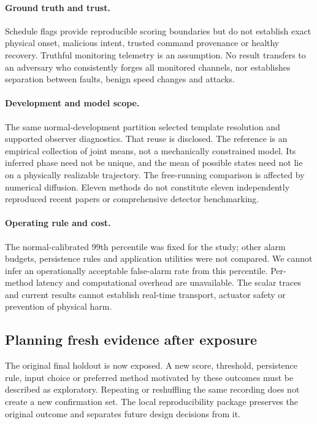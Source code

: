 \paragraph{Ground truth and trust.} Schedule flags provide reproducible scoring boundaries but do not establish exact physical onset, malicious intent, trusted command provenance or healthy recovery. Truthful monitoring telemetry is an assumption. No result transfers to an adversary who consistently forges all monitored channels, nor establishes separation between faults, benign speed changes and attacks.

\paragraph{Development and model scope.} The same normal-development partition selected template resolution and supported observer diagnostics. That reuse is disclosed. The reference is an empirical collection of joint means, not a mechanically constrained model. Its inferred phase need not be unique, and the mean of possible states need not lie on a physically realizable trajectory. The free-running comparison is affected by numerical diffusion. Eleven methods do not constitute eleven independently reproduced recent papers or comprehensive detector benchmarking.

\paragraph{Operating rule and cost.} The normal-calibrated 99th percentile was fixed for the study; other alarm budgets, persistence rules and application utilities were not compared. We cannot infer an operationally acceptable false-alarm rate from this percentile. Per-method latency and computational overhead are unavailable. The scalar traces and current results cannot establish real-time transport, actuator safety or prevention of physical harm.

\subsection{Planning fresh evidence after exposure}
The original final holdout is now exposed. A new score, threshold, persistence rule, input choice or preferred method motivated by these outcomes must be described as exploratory. Repeating or reshuffling the same recording does not create a new confirmation set. The local reproducibility package preserves the original outcome and separates future design decisions from it.

